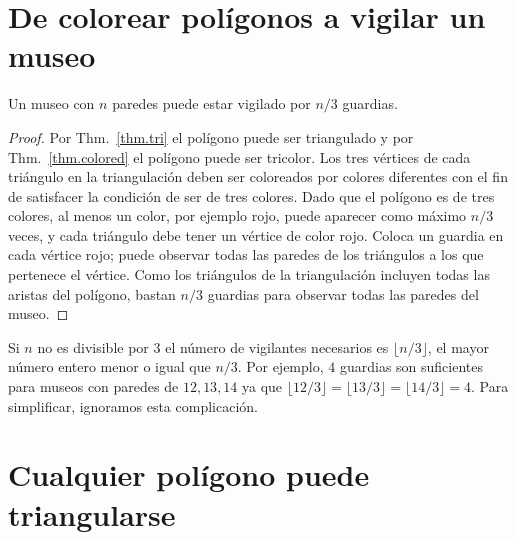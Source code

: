 \section{De colorear polígonos a vigilar un museo}\label{s.museum-guard}

\begin{theorem}\label{thm.guarded}
Un museo con $n$ paredes puede estar vigilado por $n/3$ guardias.
\end{theorem}
\begin{proof}
Por Thm.~\ref{thm.tri} el polígono puede ser triangulado y por Thm.~\ref{thm.colored} el polígono puede ser tricolor. Los tres vértices de cada triángulo en la triangulación deben ser coloreados por colores diferentes con el fin de satisfacer la condición de ser de tres colores. Dado que el polígono es de tres colores, al menos un color, por ejemplo rojo, puede aparecer como máximo $n/3$ veces, y cada triángulo debe tener un vértice de color rojo. Coloca un guardia en cada vértice rojo; puede observar todas las paredes de los triángulos a los que pertenece el vértice. Como los triángulos de la triangulación incluyen todas las aristas del polígono, bastan $n/3$ guardias para observar todas las paredes del museo.
\end{proof}
Si $n$ no es divisible por $3$ el número de vigilantes necesarios es $\lfloor n/3\rfloor$, el mayor número entero menor o igual que $n/3$. Por ejemplo, $4$ guardias son suficientes para museos con paredes de $12, 13, 14$ ya que $\lfloor 12/3\rfloor =\lfloor 13/3\rfloor=\lfloor 14/3\rfloor=4$. Para simplificar, ignoramos esta complicación.
 
\section{Cualquier polígono puede triangularse}\label{s.museum-triangulated}

